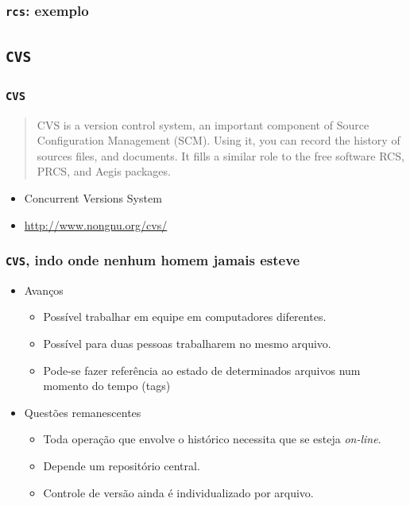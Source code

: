\documentclass{beamer}
\newcommand{\rcs}{\texttt{rcs}}
\newcommand{\cvs}{\texttt{CVS}}
\begin{document}
\begin{frame}
  \frametitle{\rcs: exemplo}
  \begin{figure}[h]
    \begin{center}
    \end{center}
    \label{fig:rcs}
  \end{figure}
\end{frame}


\subsection{\cvs}

\begin{frame}
  \frametitle{\cvs}
  \begin{quote}
    CVS is a version control system, an important component of Source
    Configuration Management (SCM). Using it, you can record the history
    of sources files, and documents. It fills a similar role to the free
    software RCS, PRCS, and Aegis packages.
  \end{quote}

  \begin{itemize}
    \item Concurrent Versions System
    \item \url{http://www.nongnu.org/cvs/}
  \end{itemize}
\end{frame}

\begin{frame}
  \frametitle{\cvs, indo onde nenhum homem jamais esteve}
  \begin{itemize}
    \item Avanços
      \begin{itemize}
        \item Possível trabalhar em equipe em computadores
          diferentes.
        \item Possível para duas pessoas trabalharem no mesmo arquivo.
        \item Pode-se fazer referência ao estado de determinados
          arquivos num momento do tempo (tags)
      \end{itemize}
    \item Questões remanescentes
      \begin{itemize}
        \item Toda operação que envolve o histórico necessita que se
          esteja \emph{on-line}.
        \item Depende um repositório central.
        \item Controle de versão ainda é individualizado por arquivo.
      \end{itemize}
  \end{itemize}
\end{frame}
\end{document}

